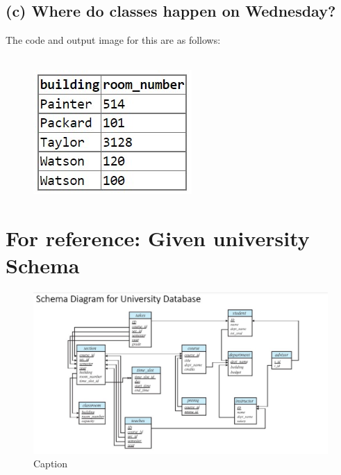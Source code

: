 \documentclass{article}
\begin{document}
\subsection{(c) Where do classes happen on Wednesday?}
The code and output image for this are as follows:\\
{
} \\
\begin{figure}[!hbt]
    \centering
    \includegraphics{pics/q4-pic3.jpg}
    \label{fig:q4p2}
\end{figure}

\newpage
\section{For reference: Given university Schema}
\begin{figure}[!hbt]
    \centering
    \includegraphics{schema.jpg}
    \caption{Caption}
    \label{fig:my_label}
\end{figure}
\end{document}
